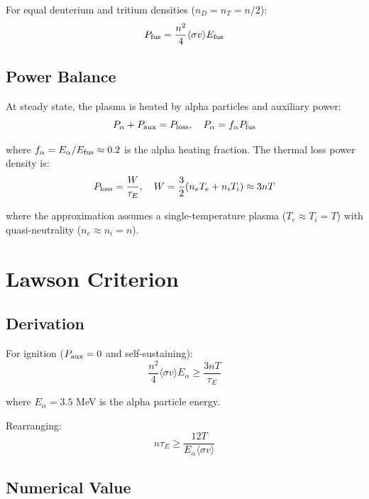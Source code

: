 \documentclass[11pt,a4paper]{article}
\begin{document}
For equal deuterium and tritium densities ($n_D = n_T = n/2$):
\begin{equation}
P_{\rm fus} = \frac{n^2}{4} \langle\sigma v\rangle E_{\rm fus}
\end{equation}

\subsection{Power Balance}

At steady state, the plasma is heated by alpha particles and auxiliary power:
\begin{equation}
P_\alpha + P_{\rm aux} = P_{\rm loss}, \quad P_\alpha = f_\alpha P_{\rm fus}
\end{equation}

where $f_\alpha = E_\alpha/E_{\rm fus} \approx 0.2$ is the alpha heating fraction.
The thermal loss power density is:
\begin{equation}
P_{\rm loss} = \frac{W}{\tau_E}, \quad W = \frac{3}{2}(n_e T_e + n_i T_i) \approx 3nT
\end{equation}

where the approximation assumes a single-temperature plasma ($T_e \approx T_i = T$)
with quasi-neutrality ($n_e \approx n_i = n$).

\section{Lawson Criterion}

\subsection{Derivation}

For ignition ($P_{\rm aux} = 0$ and self-sustaining):
\begin{equation}
\frac{n^2}{4} \langle\sigma v\rangle E_\alpha \geq \frac{3nT}{\tau_E}
\end{equation}

where $E_\alpha = 3.5$ MeV is the alpha particle energy.

Rearranging:
\begin{equation}
\boxed{n\tau_E \geq \frac{12T}{E_\alpha \langle\sigma v\rangle}}
\end{equation}

\subsection{Numerical Value}
\end{document}
